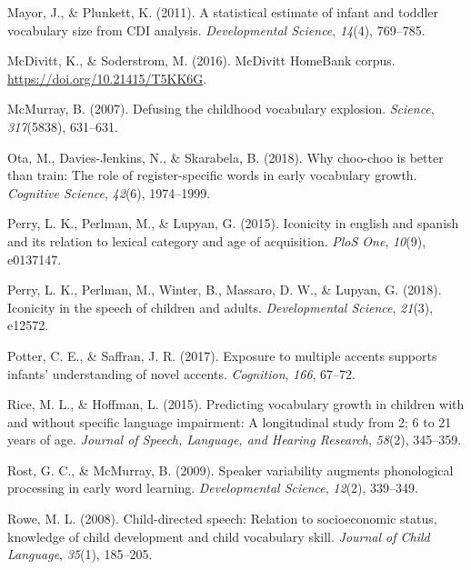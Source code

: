 \documentclass[10pt, letterpaper]{article}
\newenvironment{CSLReferences}%
  {}%
  {\par}
\begin{document}
\begin{CSLReferences}{1}{0}
\leavevmode\hypertarget{ref-mayor2011statistical}{}%
Mayor, J., \& Plunkett, K. (2011). A statistical estimate of infant and
toddler vocabulary size from CDI analysis. \emph{Developmental Science},
\emph{14}(4), 769--785.

\leavevmode\hypertarget{ref-soderstromcorpus}{}%
McDivitt, K., \& Soderstrom, M. (2016). McDivitt HomeBank corpus.
\url{https://doi.org/10.21415/T5KK6G}.

\leavevmode\hypertarget{ref-mcmurray2007defusing}{}%
McMurray, B. (2007). Defusing the childhood vocabulary explosion.
\emph{Science}, \emph{317}(5838), 631--631.

\leavevmode\hypertarget{ref-ota2018choo}{}%
Ota, M., Davies-Jenkins, N., \& Skarabela, B. (2018). Why choo-choo is
better than train: The role of register-specific words in early
vocabulary growth. \emph{Cognitive Science}, \emph{42}(6), 1974--1999.

\leavevmode\hypertarget{ref-perry2015iconicity}{}%
Perry, L. K., Perlman, M., \& Lupyan, G. (2015). Iconicity in english
and spanish and its relation to lexical category and age of acquisition.
\emph{PloS One}, \emph{10}(9), e0137147.

\leavevmode\hypertarget{ref-perry2018iconicity}{}%
Perry, L. K., Perlman, M., Winter, B., Massaro, D. W., \& Lupyan, G.
(2018). Iconicity in the speech of children and adults.
\emph{Developmental Science}, \emph{21}(3), e12572.

\leavevmode\hypertarget{ref-potter2017exposure}{}%
Potter, C. E., \& Saffran, J. R. (2017). Exposure to multiple accents
supports infants' understanding of novel accents. \emph{Cognition},
\emph{166}, 67--72.

\leavevmode\hypertarget{ref-rice2015predicting}{}%
Rice, M. L., \& Hoffman, L. (2015). Predicting vocabulary growth in
children with and without specific language impairment: A longitudinal
study from 2; 6 to 21 years of age. \emph{Journal of Speech, Language,
and Hearing Research}, \emph{58}(2), 345--359.

\leavevmode\hypertarget{ref-rost2009speaker}{}%
Rost, G. C., \& McMurray, B. (2009). Speaker variability augments
phonological processing in early word learning. \emph{Developmental
Science}, \emph{12}(2), 339--349.

\leavevmode\hypertarget{ref-rowe2008child}{}%
Rowe, M. L. (2008). Child-directed speech: Relation to socioeconomic
status, knowledge of child development and child vocabulary skill.
\emph{Journal of Child Language}, \emph{35}(1), 185--205.


\end{CSLReferences}
\end{document}
